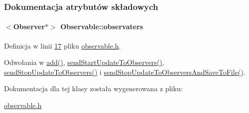 \subsubsection{Dokumentacja atrybutów składowych}
\hypertarget{class_observable_a23f06cfbce27372d95fb556ca1f392ee}{
\paragraph[{observaters}]{$<${\bf Observer}$\ast$$>$ Observable\-::observaters}}\label{class_observable_a23f06cfbce27372d95fb556ca1f392ee}


Definicja w linii \hyperlink{observable_8h_source_l00017}{17} pliku \hyperlink{observable_8h_source}{observable.\-h}.



Odwołania w \hyperlink{observable_8h_source_l00019}{add()}, \hyperlink{observable_8h_source_l00023}{send\-Start\-Update\-To\-Observers()}, \hyperlink{observable_8h_source_l00030}{send\-Stop\-Update\-To\-Observers()} i \hyperlink{observable_8h_source_l00034}{send\-Stop\-Update\-To\-Observers\-And\-Save\-To\-File()}.



Dokumentacja dla tej klasy została wygenerowana z pliku\-:\begin{DoxyCompactItemize}
\item 
\hyperlink{observable_8h}{observable.\-h}\end{DoxyCompactItemize}

